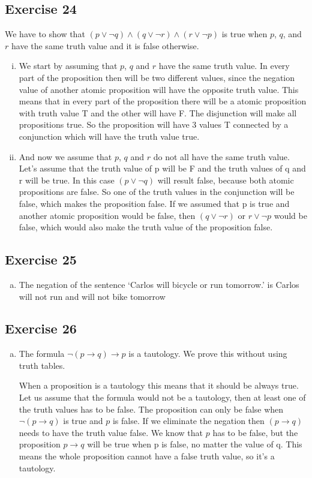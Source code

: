 \documentclass[a4paper]{article}
\newcommand{\exercise}[2]{\subsection*{Exercise #1}{#2}}
\newcommand{\exerciseenum}[2]{\subsection*{Exercise #1}{\begin{enumerate}[a)]#2\end{enumerate}}}
\begin{document}
\exercise{24}{%
We have to show that
$(p  \lor \neg q) \land (q  \lor \neg r)\land  (r  \lor \neg p)$
is true when $p$, $q$, and $r$ have the
same truth value and it is false otherwise.

\begin{enumerate}[i)]
\item
We start by assuming that $p$, $q$ and $r$ have the same truth value.
In every part of the proposition then will be two different values, since the negation value of another atomic proposition will have the opposite truth value. This means that in every part of the proposition there will be a atomic proposition with truth value T and the other will have F. The disjunction will make all propositions true. So the proposition will have 3 values T connected by a conjunction which will have the truth value true.
\item
And now we assume that $p$, $q$ and $r$ do not all have the same truth value.
Let's assume that the truth value of p will be F and the truth values of q and r will be true. In this case $(p \lor \neg q)$ will result false, because both atomic propositions are false. So one of the truth values in the conjunction will be false, which makes the proposition false. If we assumed that p is true and another atomic proposition would be false, then $(q \lor \neg r)$ or $r \lor \neg p$ would be false, which would also make the truth value of the proposition false.
\end{enumerate}
}

\exerciseenum{25}{%
\addtocounter{enumi}{1}
\item%
The negation of the sentence
`Carlos will bicycle or run tomorrow.'
is Carlos will not run and will not bike tomorrow
}

\exerciseenum{26}{%
\addtocounter{enumi}{4}
\item%
The formula
$\neg(p\to  q)\to p$
is a tautology.
We prove this without using truth tables.

\smallskip
When a proposition is a tautology this means that it should be always true. Let us assume that
the formula would not be a tautology, then at least one of the truth values has to be false. The proposition can only be false when $\neg (p \to q)$ is true and $p$ is false. If we eliminate the negation then $(p \to q)$ needs to have the truth value false. We know that $p$ has to be false, but the proposition $p \to q$ will be true when p is false, no matter the value of q. This means the whole proposition cannot have a false truth value, so it's a tautology.
}
\end{document}
